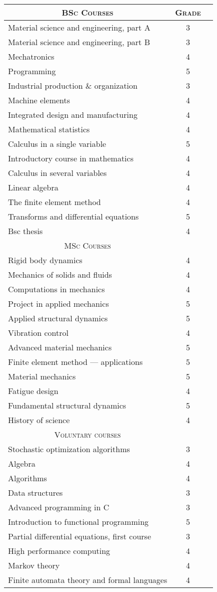 \documentclass[a4paper,10pt]{article} %
\begin{document}
\begin{center}
\begin{tabular}{lcc}

\multicolumn{1}{c}{\textsc{BSc Courses}} & \textsc{Grade}\\
\hline
Material science and engineering, part A  & 3\\
Material science and engineering, part B & 3\\
Mechatronics & 4\\
Programming & 5\\
Industrial production \& organization & 3\\
Machine elements & 4\\
Integrated design and manufacturing & 4\\
Mathematical statistics & 4\\
Calculus in a single variable & 5\\
Introductory course in mathematics & 4\\
Calculus in several variables & 4\\
Linear algebra & 4\\
The finite element method & 4\\
Transforms and differential equations & 5\\
Bsc thesis & 4\\

\multicolumn{1}{c}{\textsc{MSc Courses}} & \\
\hline
Rigid body dynamics & 4\\
Mechanics of solids and fluids & 4\\
Computations in mechanics & 4\\
Project in applied mechanics & 5\\
Applied structural dynamics & 5\\
Vibration control & 4\\
Advanced material mechanics & 5\\
Finite element method --- applications & 5\\
Material mechanics & 5\\
Fatigue design & 4\\
Fundamental structural dynamics & 5\\
History of science & 4\\

\multicolumn{1}{c}{\textsc{Voluntary courses}} & \\
\hline
Stochastic optimization algorithms & 3\\
Algebra & 4\\
Algorithms & 4\\
Data structures & 3\\
Advanced programming in C & 3\\
Introduction to functional programming & 5\\
Partial differential equations, first course & 3\\
High performance computing & 4\\
Markov theory & 4\\
Finite automata theory and formal languages & 4\\


\end{tabular}
\end{center}
\end{document}
